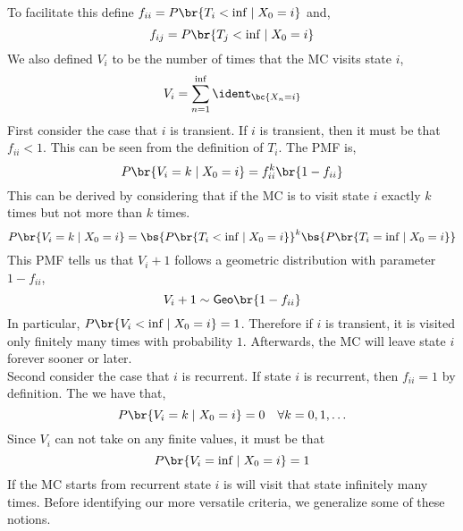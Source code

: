 \documentclass{article}
\newcommand{\Geo}{\mathsf{Geo}}
\begin{document}
To facilitate this define $f_{ii} = P\br{T_i < \inf \mid X_0 = i}$ and,
\[ f_{ij} = P\br{T_j < \inf \mid X_0 = i} \]
We also defined $V_i$ to be the number of times that the MC visits state $i$,
\[ V_i = \sum_{n=1}^{\inf} \ident_{\bc{X_n = i}} \]
First consider the case that $i$ is transient. If $i$ is transient, then it must be that $f_{ii} < 1$. This can be seen from the definition of $T_i$. The PMF is,
\[ P\br{V_i = k \mid X_0 = i} = f_{ii}^{k} \br{1 - f_{ii}} \]
This can be derived by considering that if the MC is to visit state $i$ exactly $k$ times but not more than $k$ times.
\[ P\br{V_i = k \mid X_0 = i} = \bs{P\br{T_i < \inf \mid X_0 = i}}^{k} \bs{P\br{T_i = \inf \mid X_0 = i}} \]
This PMF tells us that $V_i + 1$ follows a geometric distribution with parameter $1 - f_{ii}$,
\[ V_i + 1 \sim \Geo\br{1 - f_{ii}} \]
In particular, $P\br{V_i < \inf \mid X_0 = i} = 1$. Therefore if $i$ is transient, it is visited only finitely many times with probability $1$. Afterwards, the MC will leave state $i$ forever sooner or later.\\

Second consider the case that $i$ is recurrent. If state $i$ is recurrent, then $f_{ii} = 1$ by definition. The we have that,
\[P\br{V_i = k\mid X_0 = i} = 0 \quad \forall k = 0, 1, \ldots  \]
Since $V_i$ can not take on any finite values, it must be that
\[ P\br{V_i = \inf\mid X_0 = i} = 1 \]
If the MC starts from recurrent state $i$ is will visit that state infinitely many times. Before identifying our more versatile criteria, we generalize some of these notions.
\end{document}
